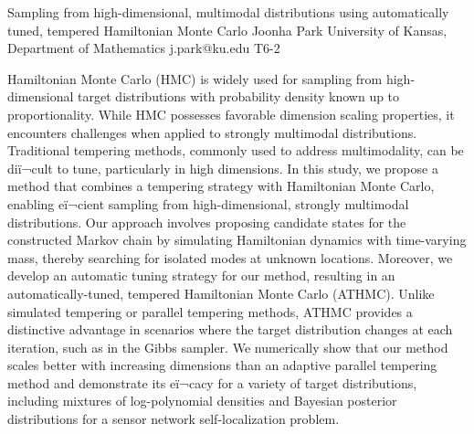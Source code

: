 \begin{talk}
  {Sampling from high-dimensional, multimodal distributions
using automatically tuned, tempered Hamiltonian Monte Carlo}%
  {Joonha Park}%
  {University of Kansas, Department of Mathematics}%
  {j.park@ku.edu}%
  {}%
  {T6-2}%

Hamiltonian Monte Carlo (HMC) is widely used for sampling from high-dimensional target distributions with probability density known up to proportionality. While HMC possesses favorable dimension scaling properties, it encounters challenges when applied to strongly multimodal distributions. Traditional tempering methods, commonly used to address multimodality, can be diï¬cult to tune, particularly in high dimensions. In this study, we propose a method that combines a tempering strategy with Hamiltonian Monte Carlo, enabling eï¬cient sampling from high-dimensional, strongly multimodal distributions. Our approach involves proposing candidate states for the constructed Markov chain by simulating Hamiltonian dynamics with time-varying mass, thereby searching for isolated modes at unknown locations. Moreover, we develop an automatic tuning strategy for our method, resulting in an automatically-tuned, tempered Hamiltonian Monte Carlo (ATHMC). Unlike simulated tempering or parallel tempering methods, ATHMC provides a distinctive advantage in scenarios where the target distribution changes at each iteration, such as in the Gibbs sampler. We numerically show that our method scales better with increasing dimensions than an adaptive parallel tempering method and demonstrate its eï¬cacy for a variety of target distributions, including mixtures of log-polynomial densities and Bayesian posterior distributions for a sensor network self-localization problem.
			
\end{talk}

